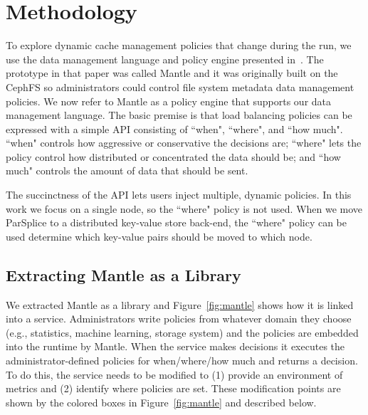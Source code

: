 \section{Methodology}

To explore dynamic cache management policies that change during the run, we use
the data management language and policy engine presented
in~\cite{sevilla:sc15-mantle}. The prototype in that paper was called Mantle
and it was originally built on the CephFS so administrators could control file
system metadata data management policies. We now refer to Mantle as a policy
engine that supports our data management language.  The basic premise is that
load balancing policies can be expressed with a simple API consisting of
``when", ``where", and ``how much". ``when" controls how aggressive or
conservative the decisions are; ``where" lets the policy control how
distributed or concentrated the data should be; and ``how much" controls the
amount of data that should be sent.

The succinctness of the API lets users inject multiple, dynamic policies. In
this work we focus on a single node, so the ``where" policy is not used. When
we move ParSplice to a distributed key-value store back-end, the ``where" policy
can be used determine which key-value pairs should be moved to which node.

\subsection{Extracting Mantle as a Library}


We extracted Mantle as a library and Figure~\ref{fig:mantle} shows how it is
linked into a service.  Administrators write policies from whatever domain they
choose ({e.g.}, statistics, machine learning, storage system) and the policies
are embedded into the runtime by Mantle. When the service makes decisions it
executes the administrator-defined policies for when/where/how much and returns
a decision.  To do this, the service needs to be modified to (1) provide an
environment of metrics and (2) identify where policies are set. These
modification points are shown by the colored boxes in Figure~\ref{fig:mantle}
and described below.

